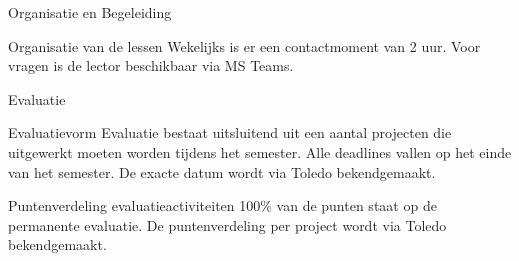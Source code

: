 \documentclass{studiewijzer}
\begin{document}
\showheader

\begin{categorybox}{Organisatie en Begeleiding}
    \begin{category}{Organisatie van de lessen}
        Wekelijks is er een contactmoment van 2 uur.
        Voor vragen is de lector beschikbaar via MS Teams.
    \end{category}
\end{categorybox}

\begin{categorybox}{Evaluatie}
    \begin{category}{Evaluatievorm}
        Evaluatie bestaat uitsluitend uit een aantal projecten die uitgewerkt moeten worden tijdens het semester.
        Alle deadlines vallen op het einde van het semester.
        De exacte datum wordt via Toledo bekendgemaakt.
    \end{category}

    \begin{category}{Puntenverdeling evaluatieactiviteiten}
        100\% van de punten staat op de permanente evaluatie.
        De puntenverdeling per project wordt via Toledo bekendgemaakt.
    \end{category}
\end{categorybox}
\end{document}

